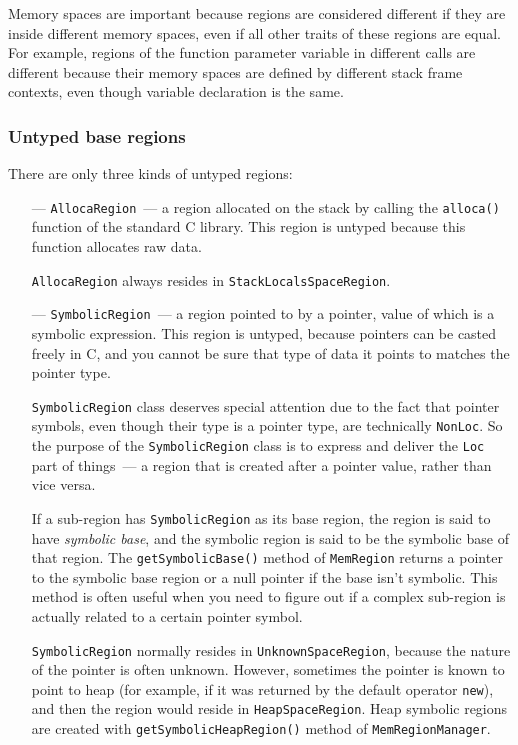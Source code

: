 \documentclass[a4paper,12pt]{article}
\begin{document}
Memory spaces are important because regions are considered different if they are inside different memory spaces, even if all other traits of these regions are equal. For example, regions of the function parameter variable in different calls are different because their memory spaces are defined by different stack frame contexts, even though variable declaration is the same.

\subsubsection{Untyped base regions}

There are only three kinds of untyped regions:

\begin{itemize}
\item[---] \lstinline|AllocaRegion|~--- a region allocated on the stack by calling the \lstinline|alloca()| function of the standard C library. This region is untyped because this function allocates raw data.

\lstinline{AllocaRegion} always resides in \lstinline|StackLocalsSpaceRegion|.
\item[---] \lstinline|SymbolicRegion|~--- a region pointed to by a pointer, value of which is a symbolic expression. This region is untyped, because pointers can be casted freely in C, and you cannot be sure that type of data it points to matches the pointer type.

\lstinline|SymbolicRegion| class deserves special attention due to the fact that pointer symbols, even though their type is a pointer type, are technically \lstinline|NonLoc|. So the purpose of the \lstinline|SymbolicRegion| class is to express and deliver the \lstinline|Loc| part of things~--- a region that is created after a pointer value, rather than vice versa.

If a sub-region has \lstinline|SymbolicRegion| as its base region, the region is said to have \emph{symbolic base}, and the symbolic region is said to be the symbolic base of that region. The  \lstinline|getSymbolicBase()| method of \lstinline|MemRegion| returns a pointer to the symbolic base region or a null pointer if the base isn't symbolic. This method is often useful when you need to figure out if a complex sub-region is actually related to a certain pointer symbol.

\lstinline|SymbolicRegion| normally resides in \lstinline|UnknownSpaceRegion|, because the nature of the pointer is often unknown. However, sometimes the pointer is known to point to heap (for example, if it was returned by the default operator \lstinline|new|), and then the region would reside in \lstinline|HeapSpaceRegion|. Heap symbolic regions are created with \lstinline|getSymbolicHeapRegion()| method of \lstinline|MemRegionManager|.
\end{itemize}
\end{document}
